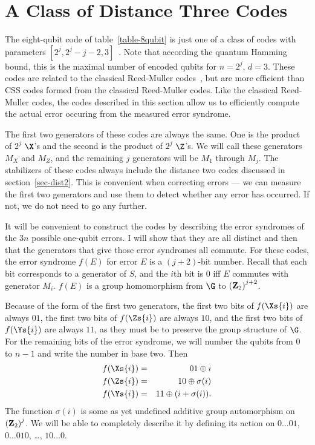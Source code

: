 \section{A Class of Distance Three Codes}
\label{sec-2toj}

The eight-qubit code of table~\ref{table-8qubit} is just one of a class of
codes with parameters $[2^j, 2^j - j - 2, 3]$~\cite{gottesman-stab}.  Note
that according the quantum Hamming bound, this is the maximal number
of encoded qubits for $n=2^j$, $d=3$.  These codes are related to the
classical Reed-Muller codes~\cite{steane-RM}, but are more efficient than
CSS codes formed from the classical Reed-Muller codes.  Like the classical
Reed-Muller codes, the codes described in this section allow us to efficiently
compute the actual error occuring from the measured error syndrome.

The first two generators of these codes are always the same.  One is the
product of $2^j$ $\X$'s and the second is the product of $2^j$ $\Z$'s.  We
will call these generators $M_X$ and $M_Z$, and the remaining $j$
generators will be $M_1$ through $M_j$.  The stabilizers of these codes
always include the distance two codes discussed in section~\ref{sec-dist2}.
This is convenient when correcting errors --- we can measure the first two
generators and use them to detect whether any error has occurred.  If not,
we do not need to go any further.

It will be convenient to construct the codes by describing the error
syndromes of the $3n$ possible one-qubit errors.  I will show that they
are all distinct and then that the generators that give those error
syndromes all commute.  For these codes, the error syndrome $f(E)$ for
error $E$ is a $(j+2)$-bit number.  Recall that each bit corresponds to a
generator of $S$, and the $i$th bit is $0$ iff $E$ commutes with generator
$M_i$.  $f(E)$ is a group homomorphism from $\G$ to $\left({\bf Z}_2
\right)^{j+2}$.

Because of the form of the first two generators, the first two bits of
$f(\Xs{i})$ are always $01$, the first two bits of $f(\Zs{i})$ are always $10$,
and the first two bits of $f(\Ys{i})$ are always $11$, as they must be to
preserve the group structure of $\G$.  For the remaining bits of the error
syndrome, we will number the qubits from $0$ to $n-1$ and write the number in
base two.  Then
\begin{eqnarray}
	f(\Xs{i}) & = & 01 \oplus i \\
	f(\Zs{i}) & = & 10 \oplus \sigma (i) \\
	f(\Ys{i}) & = & 11 \oplus (i + \sigma (i)).
\end{eqnarray}
The function $\sigma(i)$ is some as yet undefined additive group
automorphism on $\left( {\bf Z}_2 \right)^j$.  We will be able to completely
describe it by defining its action on $0 \ldots 01$, $0 \ldots 010$, \ldots,
$10 \ldots 0$.

